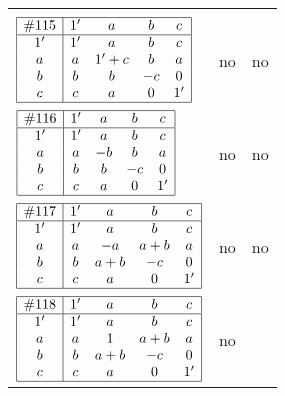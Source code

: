 \documentclass[12pt]{article}
\newcommand{\join}{\mathbin{+}}%
\newcommand{\id}{{1'}}%
\renewcommand{\top}{1}%
\begin{document}
\begin{center}
\begin{longtable}{l|c|c}
{\begin{tikzpicture}[<->,shorten <=1pt,shorten >=1pt,label distance=0mm, font=\small]
\end{tikzpicture}
}      \\[15mm]

$
\begin{array}{|c|cccc|} \hline
\#115 & \id & a & b & c \\ \hline
\id & \id & a & b & c \\
a & a & \id \join c & b & a \\
b & b & b & -c & 0 \\
c & c & a & 0 & \id \\ \hline
\end{array}
$
 & no  
 & no      \\[15mm]

$
\begin{array}{|c|cccc|} \hline
\#116 & \id & a & b & c \\ \hline
\id & \id & a & b & c \\
a & a & -b & b & a \\
b & b & b & -c & 0 \\
c & c & a & 0 & \id \\ \hline
\end{array}
$
 & no  
 & no      \\[15mm]

$
\begin{array}{|c|cccc|} \hline
\#117 & \id & a & b & c \\ \hline
\id & \id & a & b & c \\
a & a & -a & a \join b & a \\
b & b & a \join b & -c & 0 \\
c & c & a & 0 & \id \\ \hline
\end{array}
$
 & no  
 & no      \\[15mm]

$
\begin{array}{|c|cccc|} \hline
\#118 & \id & a & b & c \\ \hline
\id & \id & a & b & c \\
a & a & \top & a \join b & a \\
b & b & a \join b & -c & 0 \\
c & c & a & 0 & \id \\ \hline
\end{array}
$
 & no  
 & \adjustbox{valign=c, max height=1.6cm}{$
\left[ \begin{array}{cccccc}
\id & a & a & b & a & b \\ 
a & \id & a & a & c & a \\ 
a & a & \id & b & a & b \\ 
b & a & b & \id & a & b \\ 
a & c & a & a & \id & a \\ 
b & a & b & b & a & \id
\end{array}\right]
$}     \\[15mm]


\end{longtable}
\end{center}
\end{document}
